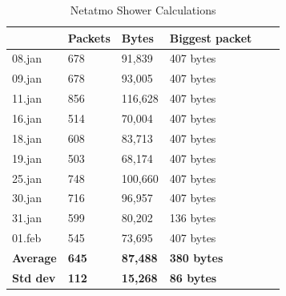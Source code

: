 \begin{table}[!ht]
    \centering
    \caption{Netatmo Shower Calculations}
    \begin{tabular}{l|l|l|l|l|l|}
        \cline{2-4}               & \textbf{Packets} & \textbf{Bytes} & \textbf{Biggest packet} \\ \hline
        \multicolumn{1}{|l|}{08.jan}           & 678          & 91,839         & 407 bytes      \\ \hline
        \multicolumn{1}{|l|}{09.jan}           & 678          & 93,005         & 407 bytes      \\ \hline
        \multicolumn{1}{|l|}{11.jan}           & 856          & 116,628        & 407 bytes      \\ \hline
        \multicolumn{1}{|l|}{16.jan}           & 514          & 70,004         & 407 bytes      \\ \hline
        \multicolumn{1}{|l|}{18.jan}           & 608          & 83,713         & 407 bytes      \\ \hline
        \multicolumn{1}{|l|}{19.jan}           & 503          & 68,174         & 407 bytes      \\ \hline
        \multicolumn{1}{|l|}{25.jan}           & 748          & 100,660        & 407 bytes      \\ \hline
        \multicolumn{1}{|l|}{30.jan}           & 716          & 96,957         & 407 bytes      \\ \hline
        \multicolumn{1}{|l|}{31.jan}           & 599          & 80,202         & 136 bytes      \\ \hline
        \multicolumn{1}{|l|}{01.feb}           & 545          & 73,695         & 407 bytes      \\ \hline
        \multicolumn{1}{|l|}{\textbf{Average}} & \textbf{645} & \textbf{87,488} & \textbf{380 bytes}   \\ \hline
        \multicolumn{1}{|l|}{\textbf{Std dev}} & \textbf{112} & \textbf{15,268} & \textbf{86 bytes}    \\ \hline
    \end{tabular}
    \label{tab:NetatmoShowerCalculations}
\end{table}

